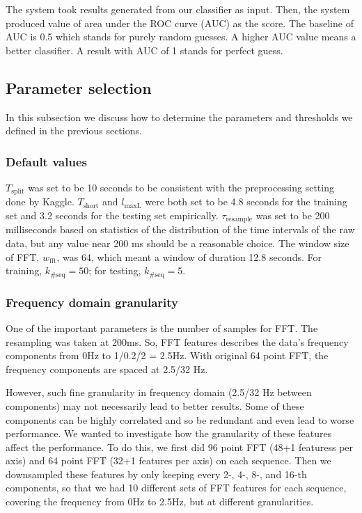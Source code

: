 \documentclass{article} %
\begin{document}
The system took results generated from our classifier as input. Then, the system produced value of area under the ROC curve (AUC) as the score. The baseline of AUC is 0.5 which stands for purely random guesses. A higher AUC value means a better classifier. A result with AUC of 1 stands for perfect guess. 

\subsection{Parameter selection}
In this subsection we discuss how to determine the parameters and thresholds we defined in the previous sections.


\subsubsection{Default values}
$T_\mathrm{split}$ was set to be 10 seconds to be consistent with the preprocessing setting done by Kaggle.  $T_\mathrm{short}$ and $l_\mathrm{maxL}$ were both set to be 4.8 seconds for the training set and 3.2 seconds for the testing set empirically. $\tau_\mathrm{resample}$ was set to be 200 milliseconds based on statistics of the distribution of the time intervals of the raw data, but any value near 200 ms should be a reasonable choice. The window size of FFT, $w_\mathrm{fft}$, was 64, which meant a window of duration 12.8 seconds. For training, $k_\mathrm{\#seq}=50$; for testing, $k_\mathrm{\#seq}=5$.

\subsubsection{Frequency domain granularity}
One of the important parameters is the number of samples for FFT. The resampling was taken at 200ms. So, FFT features describes the data’s frequency components from 0Hz to 1/0.2/2 = 2.5Hz. With original 64 point FFT, the frequency components are spaced at 2.5/32 Hz. 

However, such fine granularity in frequency domain (2.5/32 Hz between components) may not necessarily lead to better results. Some of these components can be highly correlated and so be redundant and even lead to worse performance. We wanted to investigate how the granularity of these features affect the performance. To do this, we first did 96 point FFT (48+1 featuress per axis) and 64 point FFT (32+1 features per axis) on each sequence. Then we downsampled these features by only keeping every 2-, 4-, 8-, and 16-th components, so that we had 10 different sets of FFT features for each sequence, covering the frequency from 0Hz to 2.5Hz, but at different granularities.
\end{document}
